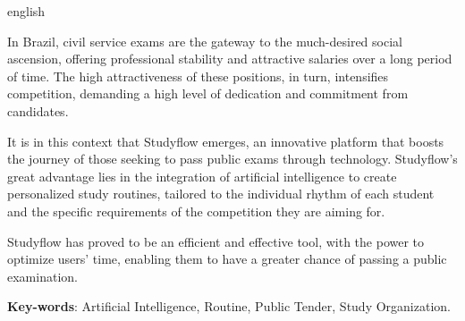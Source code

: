 
\begin{resumo}[Abstract]
 \begin{otherlanguage*}{english}

     In Brazil, civil service exams are the gateway to the much-desired social ascension, offering professional stability and attractive salaries over a long period of time. The high attractiveness of these positions, in turn, intensifies competition, demanding a high level of dedication and commitment from candidates.


    It is in this context that Studyflow emerges, an innovative platform that boosts the journey of those seeking to pass public exams through technology. Studyflow's great advantage lies in the integration of artificial intelligence to create personalized study routines, tailored to the individual rhythm of each student and the specific requirements of the competition they are aiming for.


    Studyflow has proved to be an efficient and effective tool, with the power to optimize users' time, enabling them to have a greater chance of passing a public examination.
   \noindent 
   
   \textbf{Key-words}: Artificial Intelligence, Routine, Public Tender, Study Organization.
 \end{otherlanguage*}
\end{resumo}
